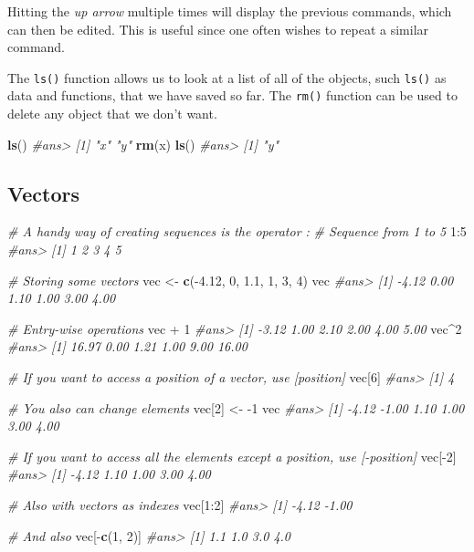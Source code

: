 \documentclass[]{book}
\newenvironment{Shaded}{\begin{snugshade}}{\end{snugshade}}
\newcommand{\KeywordTok}[1]{\textcolor[rgb]{0.13,0.29,0.53}{\textbf{{#1}}}}
\newcommand{\DecValTok}[1]{\textcolor[rgb]{0.00,0.00,0.81}{{#1}}}
\newcommand{\FloatTok}[1]{\textcolor[rgb]{0.00,0.00,0.81}{{#1}}}
\newcommand{\StringTok}[1]{\textcolor[rgb]{0.31,0.60,0.02}{{#1}}}
\newcommand{\CommentTok}[1]{\textcolor[rgb]{0.56,0.35,0.01}{\textit{{#1}}}}
\newcommand{\NormalTok}[1]{{#1}}
\begin{document}
Hitting the \emph{up arrow} multiple times will display the previous
commands, which can then be edited. This is useful since one often
wishes to repeat a similar command.

The \texttt{ls()} function allows us to look at a list of all of the
objects, such \texttt{ls()} as data and functions, that we have saved so
far. The \texttt{rm()} function can be used to delete any object that we
don't want.

\begin{Shaded}
\begin{Highlighting}[]
\KeywordTok{ls}\NormalTok{()}
\CommentTok{#ans> [1] "x" "y"}
\KeywordTok{rm}\NormalTok{(x)}
\KeywordTok{ls}\NormalTok{()}
\CommentTok{#ans> [1] "y"}
\end{Highlighting}
\end{Shaded}

\subsection{Vectors}\label{vectors}

\begin{Shaded}
\begin{Highlighting}[]

\CommentTok{# A handy way of creating sequences is the operator :}
\CommentTok{# Sequence from 1 to 5}
\DecValTok{1}\NormalTok{:}\DecValTok{5}
\CommentTok{#ans> [1] 1 2 3 4 5}

\CommentTok{# Storing some vectors}
\NormalTok{vec <-}\StringTok{ }\KeywordTok{c}\NormalTok{(-}\FloatTok{4.12}\NormalTok{, }\DecValTok{0}\NormalTok{, }\FloatTok{1.1}\NormalTok{, }\DecValTok{1}\NormalTok{, }\DecValTok{3}\NormalTok{, }\DecValTok{4}\NormalTok{)}
\NormalTok{vec}
\CommentTok{#ans> [1] -4.12  0.00  1.10  1.00  3.00  4.00}

\CommentTok{# Entry-wise operations}
\NormalTok{vec +}\StringTok{ }\DecValTok{1}
\CommentTok{#ans> [1] -3.12  1.00  2.10  2.00  4.00  5.00}
\NormalTok{vec^}\DecValTok{2}
\CommentTok{#ans> [1] 16.97  0.00  1.21  1.00  9.00 16.00}

\CommentTok{# If you want to access a position of a vector, use [position]}
\NormalTok{vec[}\DecValTok{6}\NormalTok{]}
\CommentTok{#ans> [1] 4}

\CommentTok{# You also can change elements}
\NormalTok{vec[}\DecValTok{2}\NormalTok{] <-}\StringTok{ }\NormalTok{-}\DecValTok{1}
\NormalTok{vec}
\CommentTok{#ans> [1] -4.12 -1.00  1.10  1.00  3.00  4.00}

\CommentTok{# If you want to access all the elements except a position, use [-position]}
\NormalTok{vec[-}\DecValTok{2}\NormalTok{]}
\CommentTok{#ans> [1] -4.12  1.10  1.00  3.00  4.00}

\CommentTok{# Also with vectors as indexes}
\NormalTok{vec[}\DecValTok{1}\NormalTok{:}\DecValTok{2}\NormalTok{]}
\CommentTok{#ans> [1] -4.12 -1.00}

\CommentTok{# And also}
\NormalTok{vec[-}\KeywordTok{c}\NormalTok{(}\DecValTok{1}\NormalTok{, }\DecValTok{2}\NormalTok{)]}
\CommentTok{#ans> [1] 1.1 1.0 3.0 4.0}
\end{Highlighting}
\end{Shaded}
\end{document}
